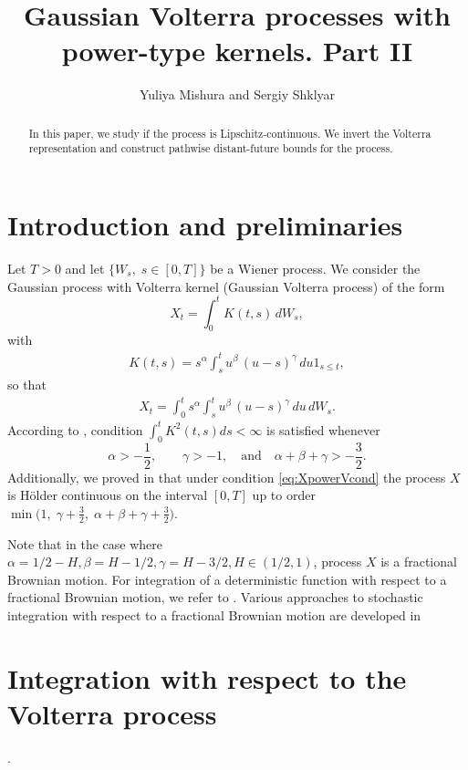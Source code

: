 \documentclass{article}
\title{Gaussian Volterra processes with power-type kernels. Part II}
\author{Yuliya Mishura and Sergiy Shklyar}
\theoremstyle{plain}
\theoremstyle{remark}
\theoremstyle{definition}
\begin{document}
\maketitle
\begin{abstract}
	
	In this paper, we study if the process is Lipschitz-continuous.
	We invert the Volterra representation
	and construct pathwise distant-future bounds for the process.
\end{abstract}

\section{Introduction and preliminaries}
Let $T>0$ and let $\{W_s,\;s\in[0,T]\}$ be a Wiener process.
We consider the Gaussian process with Volterra kernel (Gaussian Volterra process)
of the form
\begin{equation}\label{eq:VolterraPr}
X_t = \int_0^t K(t,s) \, dW_s,
\end{equation}
with
\begin{gather}
K(t,s) = s^\alpha \int_s^t u^\beta \, (u-s)^\gamma \, du 1_{s\le t},
\label{eq:KpowerV}
\end{gather}
so that \begin{gather}
X_t = \int_0^t s^\alpha \int_s^t u^\beta \, (u-s)^\gamma \, du \, dW_s.
\label{eq:XpowerV}
\end{gather}
According to \cite{Part 1}, condition $\int_0^tK^2(t,s)ds<\infty$ is   satisfied whenever
\begin{equation}
	\label{eq:XpowerVcond}
\alpha>-\frac12, \qquad
\gamma>-1, \quad \mbox{and} \quad
\alpha+\beta+\gamma > -\frac32.
\end{equation}
Additionally,   we proved in  \cite{Part 1} that under
condition \eqref{eq:XpowerVcond}
the process $X$
is H\"older continuous on the interval $[0,T]$
up to order $\min\bigl(1, \; \allowbreak
\gamma+\frac32, \; \allowbreak
\alpha+\beta+\gamma+\frac32\bigr)$.

Note that in the case where $\alpha=1/2-H, \beta=H-1/2, \gamma=H-3/2, H\in(1/2,1)$, process $X$ is a fractional Brownian motion.
For integration of a deterministic function
with respect to a fractional Brownian motion,
we refer to \cite{PapirasTaqqu2001}.
Various approaches to
stochastic integration with respect to a fractional
Brownian motion are developed in \cite{Biagini2008,Nualart2006}




\section{Integration with respect to the Volterra
process}
.
\end{document}
